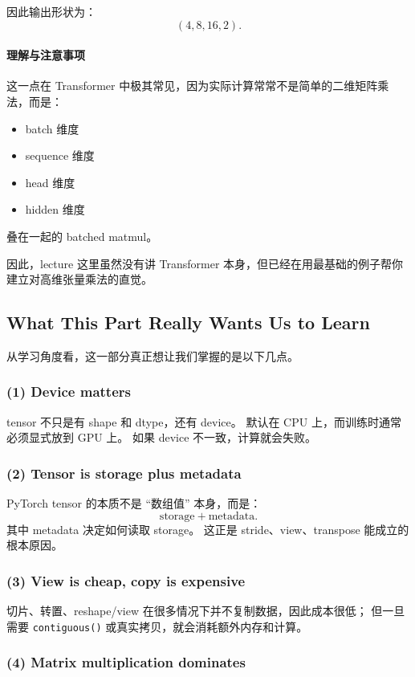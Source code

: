 \documentclass[a4paper,UTF8]{article}
\numberwithin{equation}{section}
\begin{document}
因此输出形状为：
\[
(4,8,16,2).
\]

\paragraph{理解与注意事项}
这一点在 Transformer 中极其常见，因为实际计算常常不是简单的二维矩阵乘法，而是：
\begin{itemize}
    \item batch 维度
    \item sequence 维度
    \item head 维度
    \item hidden 维度
\end{itemize}
叠在一起的 batched matmul。

因此，lecture 这里虽然没有讲 Transformer 本身，但已经在用最基础的例子帮你建立对高维张量乘法的直觉。

\subsection{What This Part Really Wants Us to Learn}

从学习角度看，这一部分真正想让我们掌握的是以下几点。

\subsubsection{(1) Device matters}

tensor 不只是有 shape 和 dtype，还有 device。  
默认在 CPU 上，而训练时通常必须显式放到 GPU 上。  
如果 device 不一致，计算就会失败。

\subsubsection{(2) Tensor is storage plus metadata}

PyTorch tensor 的本质不是 ``数组值'' 本身，而是：
\[
\text{storage} + \text{metadata}.
\]
其中 metadata 决定如何读取 storage。  
这正是 stride、view、transpose 能成立的根本原因。

\subsubsection{(3) View is cheap, copy is expensive}

切片、转置、reshape/view 在很多情况下并不复制数据，因此成本很低；  
但一旦需要 \verb|contiguous()| 或真实拷贝，就会消耗额外内存和计算。

\subsubsection{(4) Matrix multiplication dominates}
\end{document}
